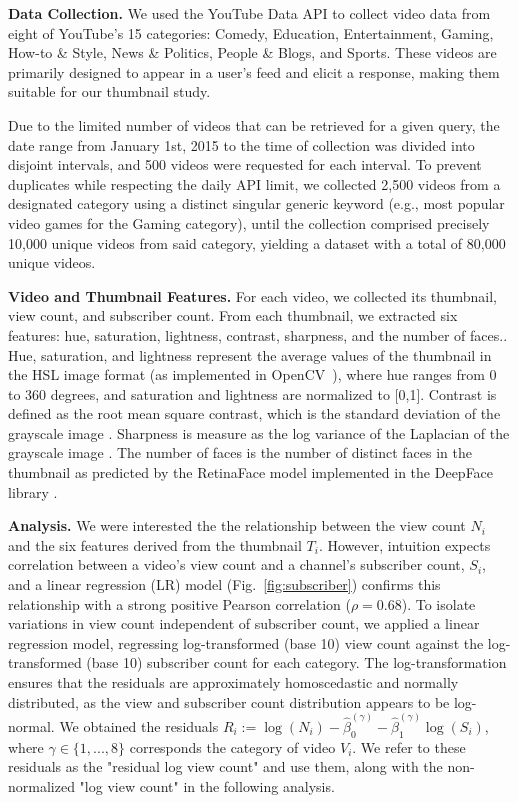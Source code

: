 \documentclass{article}
\begin{document}
\textbf{Data Collection.} We used the YouTube Data API \cite{youtubeapi} to collect video data from eight of YouTube's 15 categories: Comedy, Education, Entertainment, Gaming, How-to \& Style, News \& Politics, People \& Blogs, and Sports. These videos are primarily designed to appear in a user's feed and elicit a response, making them suitable for our thumbnail study.

Due to the limited number of videos that can be retrieved for a given query, the date range from January 1st, 2015 to the time of collection was divided into disjoint intervals, and 500 videos were requested for each interval. To prevent duplicates while respecting the daily API limit, we collected 2,500 videos from a designated category using a distinct singular generic keyword (e.g., most popular video games for the Gaming category), until the collection comprised precisely 10,000 unique videos from said category, yielding a dataset with a total of 80,000 unique videos.

\textbf{Video and Thumbnail Features.} For each video, we collected its thumbnail, view count, and subscriber count. From each thumbnail, we extracted six features: hue, saturation, lightness, contrast, sharpness, and the number of faces.. Hue, saturation, and lightness represent the average values of the thumbnail in the HSL image format \cite{HSL} (as implemented in OpenCV~\cite{opencv_library}), where hue ranges from 0 to 360 degrees, and saturation and lightness are normalized to [0,1]. Contrast is defined as the root mean square contrast, which is the standard deviation of the grayscale image \cite{contrast}. Sharpness is measure as the log variance of the Laplacian of the grayscale image \cite{sharpness}. The number of faces is the number of distinct faces in the thumbnail as predicted by the RetinaFace model implemented in the DeepFace library \cite{serengil2024lightface,serengil2020lightface}.

\textbf{Analysis.} We were interested the the relationship between the view count $N_i$ and the six features derived from the thumbnail $T_i$. However, intuition expects correlation between a video's view count and a channel's subscriber count, $S_i$, and a linear regression (LR) model (Fig.~\ref{fig:subscriber}) confirms this relationship with a strong positive Pearson correlation ($\rho=0.68$). 
To isolate variations in view count independent of subscriber count, we applied a linear regression model, regressing log-transformed (base 10) view count against the log-transformed (base 10) subscriber count for each category. The log-transformation ensures that the residuals are approximately homoscedastic and normally distributed, as the view and subscriber count distribution appears to be log-normal. We obtained the residuals $R_{i} := \log(N_i) - \hat{\beta}_0^{(\gamma)} - \hat{\beta}_1^{(\gamma)} \log(S_i)$, where $\gamma \in \{1,..., 8\}$ corresponds the category of video $V_i$. We refer to these residuals as the "residual log view count" and use them, along with the non-normalized "log view count" in the following analysis.
\end{document}
